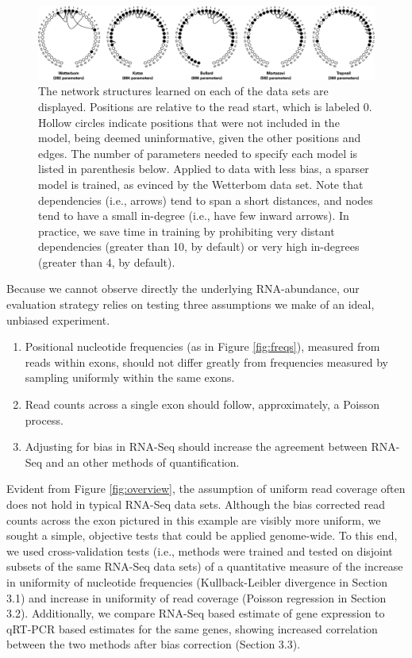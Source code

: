 \documentclass{bioinfo}
\begin{document}
\begin{figure}
\centerline{\includegraphics[width=\textwidth]{models.eps}}
\caption{
The network structures learned on each of the data sets are displayed. Positions
are relative to the read start, which is labeled 0. Hollow circles indicate
positions that were not included in the model, being deemed uninformative, given
the other positions and edges. The number of parameters needed to
specify each model is listed in parenthesis below. Applied to data with less
bias, a sparser model is trained, as evinced by the Wetterbom data set. Note
that dependencies (i.e., arrows) tend to span a short distances, and nodes tend
to have a small in-degree (i.e., have few inward arrows). In practice, we save
time in training by prohibiting very distant dependencies (greater than 10, by
default) or very high in-degrees (greater than 4, by default).
}
\label{fig:models}
\end{figure}


Because we cannot observe directly the underlying RNA-abundance, our evaluation
strategy relies on testing three assumptions we make of an ideal, unbiased experiment.
\begin{enumerate}
\item Positional nucleotide frequencies (as in Figure \ref{fig:freqs}), measured
from reads within exons, should not differ greatly from frequencies measured by
sampling uniformly within the same exons.
\item Read counts across a single exon should follow, approximately, a Poisson
process.
\item Adjusting for bias in RNA-Seq should increase the agreement between RNA-Seq and
an other methods of quantification.
\end{enumerate}

Evident from Figure \ref{fig:overview}, the assumption of uniform read coverage
often does not hold in typical RNA-Seq data sets. Although the bias corrected
read counts across the exon pictured in this example are visibly more uniform,
we sought a simple, objective tests that could be applied genome-wide. To this
end, we used cross-validation tests (i.e., methods were trained and tested on
disjoint subsets of the same RNA-Seq data sets) of a quantitative measure of the
increase in uniformity of nucleotide frequencies (Kullback-Leibler divergence in
Section 3.1) and increase in uniformity of read coverage (Poisson regression in
Section 3.2). Additionally, we compare RNA-Seq based estimate of gene expression
to qRT-PCR based estimates for the same genes, showing increased correlation
between the two methods after bias correction (Section 3.3).
\end{document}
